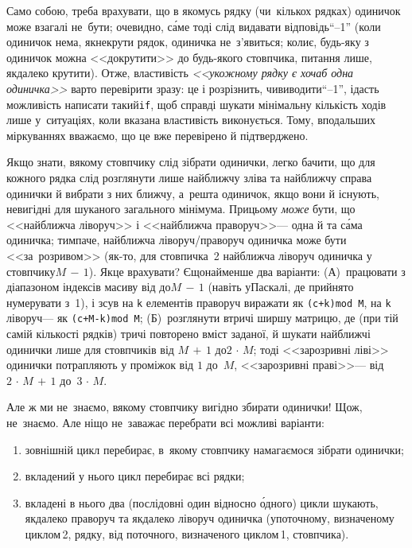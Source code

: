 \Tutorial	Само собою, треба врахувати, що в якомусь рядку (чи~кількох рядках) одиничок може взагалі не~бути; очевидно, с\'{а}ме тоді слід видавати відповідь\nolinebreak[3] ``--1'' (коли одиничок нема, як\nolinebreak[2] не\nolinebreak[3] крути рядок, одиничка не~з'явиться; коли\nolinebreak[2] є, будь-яку з одиничок можна <<докрутити>> до будь-якого стовпчика, питання лише, як\nolinebreak[3] далеко крутити). Отже, властивість \textsl{<<у\nolinebreak[3] кожному рядку є хоча\nolinebreak[3] б одна одиничка>>} варто перевірити зразу: це і розрізнить, чи\nolinebreak[2] виводити\nolinebreak[3] ``--1'', і\nolinebreak[3] дасть можливість написати такий\nolinebreak[3] \texttt{if}, щоб справді шукати мінімальну кількість ходів лише у~ситуаціях, коли вказана властивість виконується. Тому, в\nolinebreak[3] подальших міркуваннях вважаємо, що це вже перевірено й підтверджено.

Якщо знати, в\nolinebreak[2] якому стовпчику слід зібрати одинички, легко бачити, що для кожного рядка слід розглянути лише найближчу зліва та найближчу справа одинички й вибрати з них ближчу, а~решта одиничок, якщо вони й існують, невигідні для шуканого загального мінімума. При\nolinebreak[2] цьому \emph{може} бути, що <<найближча ліворуч>> і <<найближча праворуч>>\nolinebreak[3] --- одна й та с\'{а}ма одиничка; тим\nolinebreak[2] паче, найближча ліворуч/\nolinebreak[3]пра\-во\-руч одиничка може бути <<за~розривом>> (\mbox{як-то}, для стовпичка~2 найближча ліворуч одиничка у стовпчику\nolinebreak[3] ${M\,{-}\,1}$). Як\nolinebreak[3] це врахувати? Є\nolinebreak[3] щонайменше два варіанти: (А)~працювати з діапазоном індексів масиву від до\nolinebreak[2] ${M\,{-}\,1}$ (навіть у\nolinebreak[2] Паскалі, де прийнято нумерувати з~1), і зсув на \texttt{k} елементів праворуч виражати як \texttt{\mbox{(c+k)}\nolinebreak[2] mod~M}, на \texttt{k} ліворуч\nolinebreak[3] --- як \texttt{\mbox{(c+M-k)}\nolinebreak[2] mod~M}; (Б)~розглянути втричі ширшу матрицю, де (при тій самій кількості рядків) тричі повторено вміст заданої, й шукати найближчі одинички лише для стовпчиків від ${M\,{+}\,1}$ до\nolinebreak[3] ${2\,{\cdot}\,M}$; тоді <<зарозривні ліві>> одинички потрапляють у проміжок від ${1}$ до~${M}$, <<зарозривні праві>>\nolinebreak[3] --- від ${2\,{\cdot}\,M\,{+}\,1}$ до~${3\,{\cdot}\,M}$.

Але ж ми не~знаємо, в\nolinebreak[2] якому стовпчику вигідно збирати одинички! Що\nolinebreak[3] ж, не~знаємо. Але ніщо не~заважає перебрати всі можливі варіанти:
\begin{enumerate} 
\item	зовнішній цикл перебирає, в~якому стовпчику намагаємося зібрати одинички;
\item	вкладений у нього цикл перебирає всі рядки;
\item	вкладені в нього два (послідовні один відносно \'{о}дного) цикли шукають, як\nolinebreak[2] далеко праворуч та як\nolinebreak[2] далеко ліворуч одиничка (у\nolinebreak[3] поточному, визначеному циклом\nolinebreak[3] \textnumero$\,$2, рядку, від поточного, визначеного циклом\nolinebreak[3] \textnumero$\,$1, стовпчика).
\end{enumerate}

